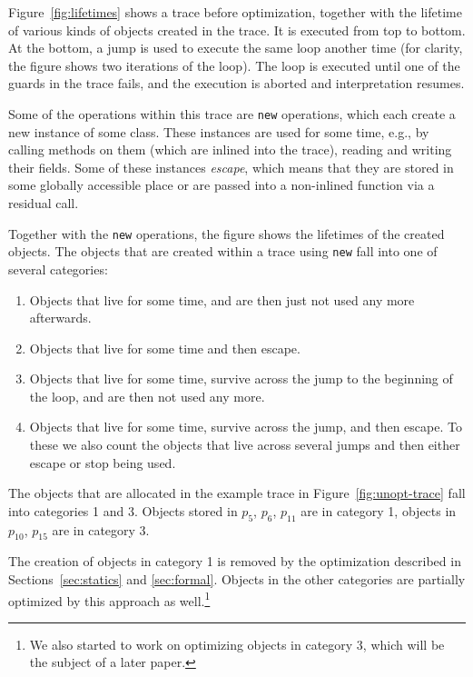 \documentclass[preprint]{sigplanconf}
\newcommand\eg{e.g.,\xspace}
\begin{document}
Figure~\ref{fig:lifetimes} shows a trace before optimization, together with the
lifetime of various kinds of objects created in the trace. It is executed from
top to bottom. At the bottom, a jump is used to execute the same loop another
time (for clarity, the figure shows two iterations of the loop). The loop is
executed until one of the guards in the trace fails, and the execution is
aborted and interpretation resumes.

Some of the operations within this trace are \lstinline{new} operations, which each
create a new instance of some class. These instances are used for some time, \eg
by calling methods on them (which are inlined into the trace), reading and
writing their fields. Some of these instances \emph{escape}, which means that
they are stored in some globally accessible place or are passed into a
non-inlined function via a residual call.

Together with the \lstinline{new} operations, the figure shows the lifetimes of the
created objects. The objects that are created within a trace using \lstinline{new}
fall into one of several categories:

\begin{enumerate}
    \item Objects that live for some time, and are then just not
    used any more afterwards.

    \item Objects that live for some time and then escape.

    \item Objects that live for some time, survive across the jump to
    the beginning of the loop, and are then not used any more.

    \item Objects that live for some time, survive across the jump,
    and then escape. To these we also count the objects that live across several
    jumps and then either escape or stop being used.
\end{enumerate}

The objects that are allocated in the example trace in
Figure~\ref{fig:unopt-trace} fall into categories 1 and 3. Objects stored in
$p_{5}$, $p_{6}$, $p_{11}$ are in category 1, objects in $p_{10}$, $p_{15}$ are in
category 3.

The creation of objects in category 1 is removed by the optimization described
in Sections~\ref{sec:statics} and \ref{sec:formal}. Objects in the other
categories are partially optimized by this approach as well.\footnote{We also started to
work on optimizing objects in category 3, which will be the subject of a later
paper.}
\end{document}
